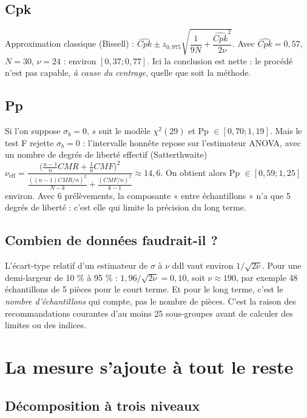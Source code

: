 \documentclass[11pt,a4paper]{article}
\theoremstyle{tq}
\theoremstyle{remark}
\newcommand{\sbt}{\sigma_b}
\begin{document}
\subsection{Cpk}

Approximation classique (Bissell) : $\widehat{Cpk}\pm z_{0{,}975}\sqrt{\dfrac{1}{9N}+\dfrac{\widehat{Cpk}^2}{2\nu}}$. Avec $\widehat{Cpk}=0{,}57$, $N=30$, $\nu=24$ : environ $[0{,}37 ; 0{,}77]$. Ici la conclusion est nette : le procédé n'est pas capable, \emph{à cause du centrage}, quelle que soit la méthode.

\subsection{Pp}

Si l'on suppose $\sbt=0$, $s$ suit le modèle $\chi^2(29)$ et Pp $\in[0{,}70 ; 1{,}19]$. Mais le test F rejette $\sbt=0$ : l'intervalle honnête repose sur l'estimateur ANOVA, avec un nombre de degrés de liberté effectif (Satterthwaite) $\nu_{\text{eff}} = \dfrac{\big(\frac{n-1}{n}CMR+\frac{1}{n}CMF\big)^2}{\frac{((n-1)CMR/n)^2}{N-k}+\frac{(CMF/n)^2}{k-1}} \approx 14{,}6$. On obtient alors Pp $\in [0{,}59 ; 1{,}25]$ environ. Avec 6 prélèvements, la composante « entre échantillons » n'a que 5 degrés de liberté : c'est elle qui limite la précision du long terme.

\subsection{Combien de données faudrait-il ?}

L'écart-type relatif d'un estimateur de $\sigma$ à $\nu$ ddl vaut environ $1/\sqrt{2\nu}$. Pour une demi-largeur de 10 \% à 95 \% : $1{,}96/\sqrt{2\nu}=0{,}10$, soit $\nu\approx 190$, par exemple 48 échantillons de 5 pièces pour le court terme. Et pour le long terme, c'est le \emph{nombre d'échantillons} qui compte, pas le nombre de pièces. C'est la raison des recommandations courantes d'au moins 25 sous-groupes avant de calculer des limites ou des indices.

\section{La mesure s'ajoute à tout le reste}

\subsection{Décomposition à trois niveaux}
\end{document}
